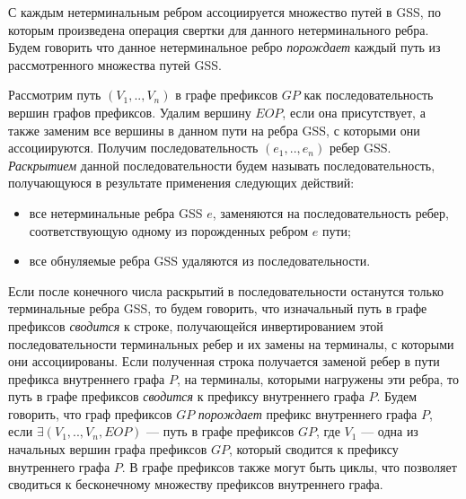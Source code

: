 С каждым нетерминальным ребром ассоциируется множество путей в GSS, по которым произведена операция свертки для данного нетерминального ребра. Будем говорить что данное нетерминальное ребро \emph{порождает} каждый путь из рассмотренного множества путей GSS.
% 

Рассмотрим путь $(V_{1},..,V_{n})$ в графе префиксов $GP$ как последовательность вершин графов префиксов. Удалим вершину $EOP$, если она присутствует, а также заменим все вершины в данном пути на ребра GSS, с которыми они ассоциируются. Получим последовательность $(e_{1},..,e_{n})$ ребер GSS. \emph{Раскрытием} данной последовательности будем называть последовательность, получающуюся в результате применения следующих действий:
\begin{itemize}
    \item все нетерминальные ребра GSS $e$, заменяются на последовательность ребер, соответствующую одному из порожденных ребром $e$ пути;
    \item все обнуляемые ребра GSS удаляются из последовательности.
\end{itemize}
Если после конечного числа раскрытий в последовательности останутся только терминальные ребра GSS, то будем говорить, что изначальный путь в графе префиксов \emph{сводится} к строке, получающейся инвертированием этой последовательности терминальных ребер и их замены на терминалы, с которыми они ассоциированы. Если полученная строка получается заменой ребер в пути префикса внутреннего графа $P$, на терминалы, которыми нагружены эти ребра, то путь в графе префиксов \emph{сводится} к префиксу внутреннего графа $P$. Будем говорить, что граф префиксов $GP$ \emph{порождает} префикс внутреннего графа $P$, если $\exists (V_{1},..,V_{n},EOP)$ --- путь в графе префиксов $GP$, где $V_{1}$ --- одна из начальных вершин графа префиксов $GP$, который сводится к префиксу внутреннего графа $P$. В графе префиксов также могут быть циклы, что позволяет сводиться к бесконечному множеству префиксов внутреннего графа.

